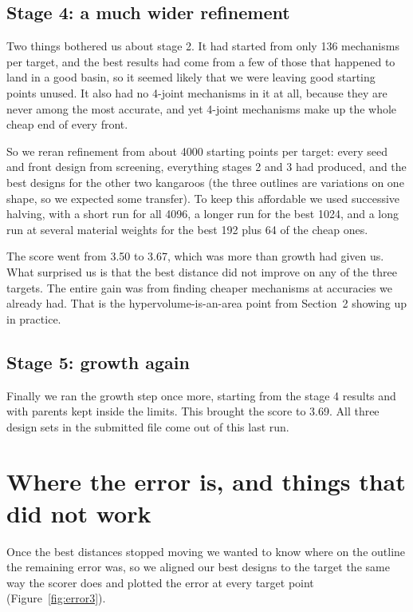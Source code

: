 \documentclass[11pt]{article}
\begin{document}
\subsection{Stage 4: a much wider refinement}

Two things bothered us about stage 2. It had started from only 136 mechanisms
per target, and the best results had come from a few of those that happened
to land in a good basin, so it seemed likely that we were leaving good starting
points unused. It also had no 4-joint mechanisms in it at all, because they
are never among the most accurate, and yet 4-joint mechanisms make up the
whole cheap end of every front.

So we reran refinement from about 4000 starting points per target: every seed
and front design from screening, everything stages 2 and 3 had produced, and
the best designs for the other two kangaroos (the three outlines are
variations on one shape, so we expected some transfer). To keep this
affordable we used successive halving, with a short run for all 4096, a longer
run for the best 1024, and a long run at several material weights for the best
192 plus 64 of the cheap ones.

The score went from 3.50 to 3.67, which was more than growth had given us. What
surprised us is that the best distance did not improve on any of the three
targets. The entire gain was from finding cheaper mechanisms at accuracies we
already had. That is the hypervolume-is-an-area point from Section~2 showing up
in practice.

\subsection{Stage 5: growth again}

Finally we ran the growth step once more, starting from the stage 4 results and
with parents kept inside the limits. This brought the score to 3.69. All three
design sets in the submitted file come out of this last run.

\section{Where the error is, and things that did not work}
\label{sec:error}

Once the best distances stopped moving we wanted to know where on the outline
the remaining error was, so we aligned our best designs to the target the same
way the scorer does and plotted the error at every target point
(Figure~\ref{fig:error3}).
\end{document}
